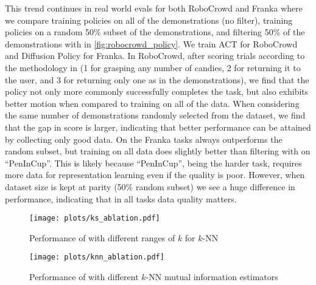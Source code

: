This trend continues in real world evals for both RoboCrowd and Franka where we compare training policies on all of the demonstrations (no filter), training policies on a random 50\% subset of the demonstrations, and filtering 50\% of the demonstrations with \abv in \cref{fig:robocrowd_policy}. We train ACT \citep{zhao2023aloha} for RoboCrowd and Diffusion Policy \citep{chi2023diffusion} for Franka. In RoboCrowd, after scoring trials according to the methodology in \citet{mirchandani2024robocrowd} (1 for grasping any number of candies, 2 for returning it to the user, and 3 for returning only one as in the demonstrations), we find that the \abv policy not only more commonly successfully completes the task, but also exhibits better motion when compared to training on all of the data. When considering the same number of demonstrations randomly selected from the dataset, we find that the gap in score is larger, indicating that better performance can be attained by collecting only good data. On the Franka tasks \abv always outperforms the random subset, but training on all data does slightly better than filtering with \abv on ``PenInCup''. This is likely because ``PenInCup'', being the harder task, requires more data for representation learning even if the quality is poor. However, when dataset size is kept at parity (50\% random subset) we see a huge difference in performance, indicating that in all tasks data quality matters.


\begin{figure}
    \centering
    \texttt{[image: plots/ks\_ablation.pdf]}
    \vspace{-0.1in}
    \caption{Performance of 
    \abv with different ranges of $k$ for $k$-NN}
    \label{fig:ks_ablation}
\end{figure}


\begin{figure}
    \centering
    \texttt{[image: plots/knn\_ablation.pdf]}
    \vspace{-0.15in}
    \caption{Performance of 
    \abv with different $k$-NN mutual information estimators}
    \label{fig:knn_ablation}
\end{figure}


